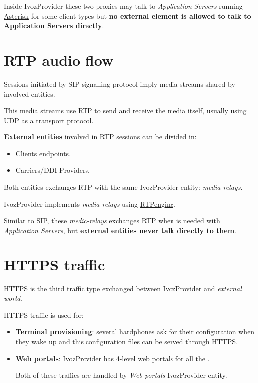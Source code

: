 \documentclass[letterpaper,10pt,english]{sphinxmanual}
\begin{document}
Inside IvozProvider these two proxies may talk to \emph{Application Servers} running
\href{http://www.asterisk.org/}{Asterisk} for some client types but \textbf{no external
element is allowed to talk to Application Servers directly}.


\section{RTP audio flow}
\label{basic_concepts/architecture/index:rtp-audio-flow}\label{basic_concepts/architecture/index:audioflow}
Sessions initiated by SIP signalling protocol imply media streams shared by
involved entities.

This media streams use \href{https://tools.ietf.org/html/rfc3550}{RTP} to send and
receive the media itself, usually using UDP as a transport protocol.

\textbf{External entities} involved in RTP sessions can be divided in:
\begin{itemize}
\item {} 
Clients endpoints.

\item {} 
Carriers/DDI Providers.

\end{itemize}

Both entities exchanges RTP with the same IvozProvider entity: \emph{media-relays}.

IvozProvider implements \emph{media-relays} using \href{https://github.com/sipwise/rtpengine}{RTPengine}.

Similar to SIP, these \emph{media-relays} exchanges RTP when is needed with
\emph{Application Servers}, but \textbf{external entities never talk directly to them}.


\section{HTTPS traffic}
\label{basic_concepts/architecture/index:https-traffic}
HTTPS is the third traffic type exchanged between IvozProvider and \emph{external
world}.

HTTPS traffic is used for:
\begin{itemize}
\item {} 
\textbf{Terminal provisioning}: several hardphones ask for their configuration when
they wake up and this configuration files can be served through HTTPS.

\item {} 
\textbf{Web portals}: IvozProvider has 4-level web portals for all the
{\hyperref[basic_concepts/operation_roles/index:operation\string-roles]{}}.

Both of these traffics are handled by \emph{Web portals} IvozProvider entity.

\end{itemize}
\end{document}
